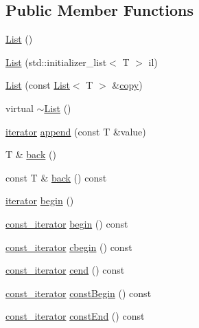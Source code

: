 \subsection*{Public Member Functions}
\begin{DoxyCompactItemize}
\item 
\hyperlink{classprism_1_1_list_af81334fa20cb34b36a40d0ac4c36e2a5}{List} ()
\item 
\hyperlink{classprism_1_1_list_a344a7102226e251cc039476e7680c3b8}{List} (std\+::initializer\+\_\+list$<$ T $>$ il)
\item 
\hyperlink{classprism_1_1_list_a8f2ff5a39c10ca4f57b5d3794e72cf93}{List} (const \hyperlink{classprism_1_1_list}{List}$<$ T $>$ \&\hyperlink{namespaceprism_ae776f4cd825f79e7af1cf6ee1d90a209}{copy})
\item 
virtual \hyperlink{classprism_1_1_list_aaa8567cc4eb408e62117f1a9782629ba}{$\sim$\+List} ()
\item 
\hyperlink{classprism_1_1_list_a6cf00c98a428ed325fe9ccc60d7ef95a}{iterator} \hyperlink{classprism_1_1_list_a5e6584f87eee4371e308e1aa9c3da6c8}{append} (const T \&value)
\item 
T \& \hyperlink{classprism_1_1_list_a557466129db60dc92eaa68b18012900e}{back} ()
\item 
const T \& \hyperlink{classprism_1_1_list_a6031d94f7c8a88224364523d10a2eff4}{back} () const 
\item 
\hyperlink{classprism_1_1_list_a6cf00c98a428ed325fe9ccc60d7ef95a}{iterator} \hyperlink{classprism_1_1_list_ac86cc19f89e9913ea93f3b212d531954}{begin} ()
\item 
\hyperlink{classprism_1_1_list_a038bd36af263a85110467528db8305d5}{const\+\_\+iterator} \hyperlink{classprism_1_1_list_a9d4e4d463be411b27307dcf3cdc49422}{begin} () const 
\item 
\hyperlink{classprism_1_1_list_a038bd36af263a85110467528db8305d5}{const\+\_\+iterator} \hyperlink{classprism_1_1_list_a55b460a5a5e00aeee87df83e8559349c}{cbegin} () const 
\item 
\hyperlink{classprism_1_1_list_a038bd36af263a85110467528db8305d5}{const\+\_\+iterator} \hyperlink{classprism_1_1_list_a1b526719a7f63a47482ff0b293d36ad1}{cend} () const 
\item 
\hyperlink{classprism_1_1_list_a038bd36af263a85110467528db8305d5}{const\+\_\+iterator} \hyperlink{classprism_1_1_list_a19923a3ef18676b387972dcb78f5a131}{const\+Begin} () const 
\item 
\hyperlink{classprism_1_1_list_a038bd36af263a85110467528db8305d5}{const\+\_\+iterator} \hyperlink{classprism_1_1_list_af8f11fb293ac9961acf72e76c4128473}{const\+End} () const 

\end{DoxyCompactItemize}
